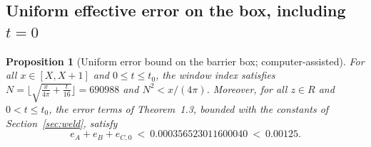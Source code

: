 \documentclass[11pt]{article}
\newtheorem{proposition}[theorem]{Proposition}
\theoremstyle{definition}
\begin{document}
\subsection{Uniform effective error on the box, including $t=0$}
\label{sec:barriererr}

\begin{proposition}[Uniform error bound on the barrier box;
computer-assisted]\label{prop:barriererr}
For all $x\in[X,X+1]$ and $0\le t\le t_0$, the window index satisfies
$N=\bigl\lfloor\sqrt{\frac{x}{4\pi}+\frac t{16}}\bigr\rfloor=690988$
and $N^2<x/(4\pi)$. Moreover, for all $z\in R$ and $0<t\le t_0$, the
error terms of Theorem~1.3, bounded with the constants of
Section~\ref{sec:weld}, satisfy
\begin{equation}\label{eq:barriererror}
e_A+e_B+e_{C,0}\ <\ 0.000356523011600040\ <\ 0.00125 .
\end{equation}
\end{proposition}
\end{document}
